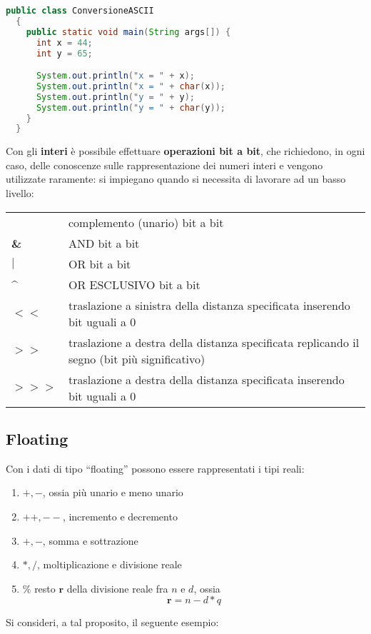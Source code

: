 \documentclass[a4paper]{extarticle}
\newcommand{\quotes}[1]{``#1''}
\begin{document}
\vspace{1em}
\noindent
\begin{lstlisting}[language=Java, caption=Conversione da intero a carattere in Java]
  public class ConversioneASCII
  {
    public static void main(String args[]) {
      int x = 44;
      int y = 65;

      System.out.println("x = " + x);
      System.out.println("x = " + char(x));
      System.out.println("y = " + y);
      System.out.println("y = " + char(y));
    }
  }
\end{lstlisting}
\vspace{1em}

\noindent
Con gli \textbf{interi} è possibile effettuare \textbf{operazioni bit a bit}, che richiedono, in ogni caso, delle conoscenze sulle rappresentazione dei numeri interi e vengono utilizzate raramente: si impiegano quando si necessita di lavorare ad un basso livello:

\vspace{1em}
\noindent
{}
\begin{tabularx}{\textwidth}{|P|P|}
  \hline
  \\
  \hline
  \textbf{~} & complemento (unario) bit a bit\\
  \hline
  \textbf{\&} & AND bit a bit\\
  \hline
  \textbf{$\vert$} & OR bit a bit\\
  \hline
  \textbf{\^} & OR ESCLUSIVO bit a bit\\
  \hline
  \textbf{$<<$} & traslazione a sinistra della distanza specificata inserendo bit uguali a $0$\\
  \hline
  \textbf{$>>$} & traslazione a destra della distanza specificata replicando il segno (bit più significativo)\\
  \hline
  \textbf{$>>>$} & traslazione a destra della distanza specificata inserendo bit uguali a $0$\\
  \hline
\end{tabularx}

\vspace{1em}
\subsection{Floating}
Con i dati di tipo \quotes{floating} possono essere rappresentati i tipi reali:
\begin{enumerate}
  \item $+,-$, ossia più unario e meno unario
  \item $++,--$, incremento e decremento
  \item $+,-$, somma e sottrazione
  \item $\ast,/$, moltiplicazione e divisione reale
  \item $\%$ resto $\boldsymbol{r}$ della divisione reale fra $n$ e $d$, ossia
  \[\boldsymbol{r} = n - d \ast q\]
\end{enumerate}
Si consideri, a tal proposito, il seguente esempio:
\end{document}

